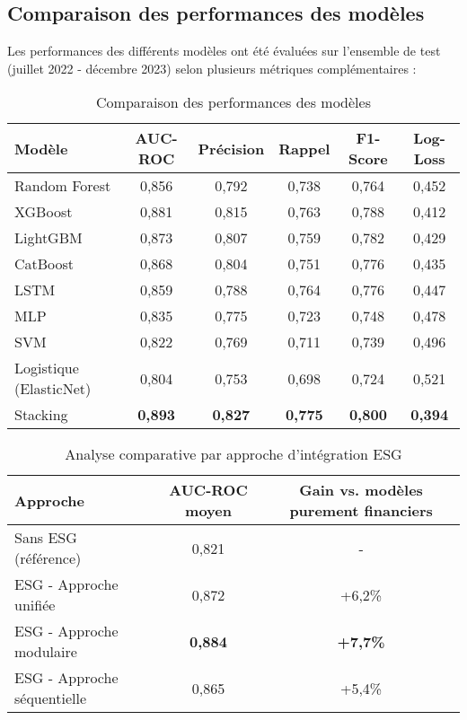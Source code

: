 \subsection{Comparaison des performances des modèles}

Les performances des différents modèles ont été évaluées sur l'ensemble de test (juillet 2022 - décembre 2023) selon plusieurs métriques complémentaires :

\begin{table}[htbp]
  \centering
  \caption{Comparaison des performances des modèles}
  \begin{tabular}{lccccc}
    \toprule
    \textbf{Modèle} & \textbf{AUC-ROC} & \textbf{Précision} & \textbf{Rappel} & \textbf{F1-Score} & \textbf{Log-Loss} \\
    \midrule
    Random Forest & 0,856 & 0,792 & 0,738 & 0,764 & 0,452 \\
    XGBoost & 0,881 & 0,815 & 0,763 & 0,788 & 0,412 \\
    LightGBM & 0,873 & 0,807 & 0,759 & 0,782 & 0,429 \\
    CatBoost & 0,868 & 0,804 & 0,751 & 0,776 & 0,435 \\
    LSTM & 0,859 & 0,788 & 0,764 & 0,776 & 0,447 \\
    MLP & 0,835 & 0,775 & 0,723 & 0,748 & 0,478 \\
    SVM & 0,822 & 0,769 & 0,711 & 0,739 & 0,496 \\
    Logistique (ElasticNet) & 0,804 & 0,753 & 0,698 & 0,724 & 0,521 \\
    Stacking & \textbf{0,893} & \textbf{0,827} & \textbf{0,775} & \textbf{0,800} & \textbf{0,394} \\
    \bottomrule
  \end{tabular}
\end{table}

\begin{table}[htbp]
  \centering
  \caption{Analyse comparative par approche d'intégration ESG}
  \begin{tabular}{lcc}
    \toprule
    \textbf{Approche} & \textbf{AUC-ROC moyen} & \textbf{Gain vs. modèles purement financiers} \\
    \midrule
    Sans ESG (référence) & 0,821 & - \\
    ESG - Approche unifiée & 0,872 & +6,2\% \\
    ESG - Approche modulaire & \textbf{0,884} & \textbf{+7,7\%} \\
    ESG - Approche séquentielle & 0,865 & +5,4\% \\
    \bottomrule
  \end{tabular}
\end{table}

